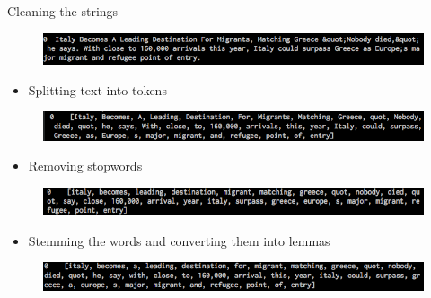 \documentclass{beamer}
\begin{document}
\begin{frame}{Cleaning the strings}

\vspace{-0.5cm}

\begin{figure}[H]
\centering
\includegraphics[scale=0.5]{Text_Processing/1.png}
\label{heat}
\end{figure}

\begin{itemize}
\item Splitting text into tokens
\end{itemize}

\vspace{-0.5cm}

\begin{figure}[H]
\centering
\includegraphics[scale=0.5]{Text_Processing/2.png}
\label{heat}
\end{figure}

\begin{itemize}
\item Removing stopwords
\end{itemize}

\vspace{-0.5cm}

\begin{figure}[H]
\centering
\includegraphics[scale=0.5]{Text_Processing/3.png}
\label{heat}
\end{figure}

\begin{itemize}
\item Stemming the words and converting them into lemmas
\end{itemize}

\vspace{-0.5cm}
 
\begin{figure}[H]
\centering
\includegraphics[scale=0.5]{Text_Processing/4.png}
\label{heat}
\end{figure}


\end{frame}
\end{document}
